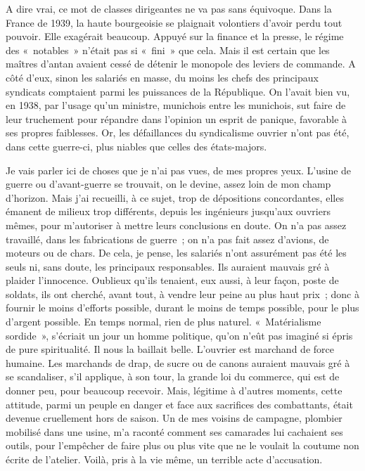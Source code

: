 \documentclass[french,twoside]{book} %
\begin{document}
\noindent A dire vrai, ce mot de classes dirigeantes ne va pas sans équivoque. Dans la France de 1939, la haute bourgeoisie se plaignait volontiers d’avoir perdu tout pouvoir. Elle exagérait beaucoup. Appuyé sur la finance et la presse, le régime des « notables » n’était pas si « fini » que cela. Mais il est certain que les maîtres d’antan avaient cessé de détenir le monopole des leviers de commande. A côté d’eux, sinon les salariés en masse, du moins les chefs des principaux syndicats comptaient parmi les puissances de la République. On l’avait bien   vu, en 1938, par l’usage qu’un ministre, munichois entre les munichois, sut faire de leur truchement pour répandre dans l’opinion un esprit de panique, favorable à ses propres faiblesses. Or, les défaillances du syndicalisme ouvrier n’ont pas été, dans cette guerre-ci, plus niables que celles des états-majors.\par
Je vais parler ici de choses que je n’ai pas vues, de mes propres yeux. L’usine de guerre ou d’avant-guerre se trouvait, on le devine, assez loin de mon champ d’horizon. Mais j’ai recueilli, à ce sujet, trop de dépositions concordantes, elles émanent de milieux trop différents, depuis les ingénieurs jusqu’aux ouvriers mêmes, pour m’autoriser à mettre leurs conclusions en doute. On n’a pas assez travaillé, dans les fabrications de guerre ; on n’a pas fait assez d’avions, de moteurs ou de chars. De cela, je pense, les salariés n’ont assurément pas été les seuls ni, sans doute, les principaux responsables. Ils auraient mauvais gré à plaider l’innocence. Oublieux qu’ils tenaient, eux aussi, à leur façon, poste de soldats, ils ont cherché, avant tout, à vendre leur peine au plus haut prix ; donc à fournir le moins d’efforts possible, durant le moins de temps possible, pour le plus d’argent possible. En temps normal, rien de plus naturel. « Matérialisme sordide », s’écriait un jour un homme politique, qu’on n’eût pas imaginé si épris de pure spiritualité. Il nous la baillait belle. L’ouvrier est marchand de force humaine. Les marchands de drap, de sucre ou de canons auraient mauvais gré à se scandaliser, s’il applique, à son tour, la grande loi du commerce, qui est de donner peu, pour beaucoup recevoir. Mais, légitime à d’autres moments, cette attitude, parmi un peuple en danger et face aux sacrifices des combattants, était devenue cruellement hors de saison. Un de mes voisins de campagne, plombier mobilisé dans une usine, m’a raconté comment ses camarades lui cachaient ses outils, pour l’empêcher de faire plus ou plus vite que ne le voulait la coutume non   écrite de l’atelier. Voilà, pris à la vie même, un terrible acte d’accusation.\par
\end{document}
